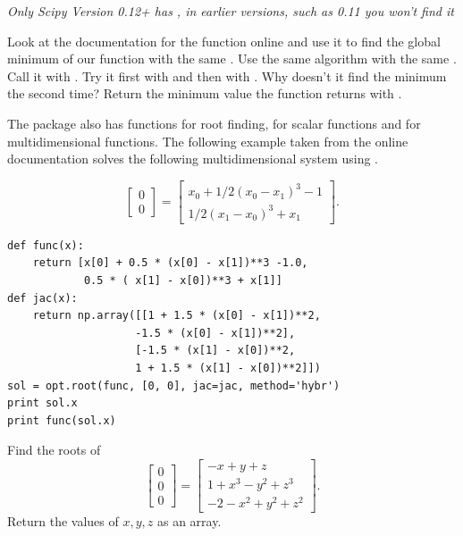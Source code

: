 \emph{Only Scipy Version 0.12+ has , in earlier versions, such as 0.11 you won't find it}
\begin{problem}

Look at the documentation for the  function online and use it to find the global minimum of our function with the same . Use the same  algorithm with the same . Call it with .
Try it first with  and then with . Why doesn't it find the minimum the second time? Return the minimum value the function returns with .

\end{problem}

The  package also has functions for root finding, for scalar functions and for multidimensional functions. The following example taken from the online documentation solves the following multidimensional system using .

\[
\begin{bmatrix}
	0 \\
	0
\end{bmatrix} = \begin{bmatrix}
	x_{0} + 1/2 ( x_{0} - x_{1} )^{3} - 1 \\
	1/2(x_{1}-x_{0})^{3} + x_{1}
\end{bmatrix}.
\]

\begin{lstlisting}
def func(x):
    return [x[0] + 0.5 * (x[0] - x[1])**3 -1.0,
            0.5 * ( x[1] - x[0])**3 + x[1]]
def jac(x):
    return np.array([[1 + 1.5 * (x[0] - x[1])**2,
                    -1.5 * (x[0] - x[1])**2],
                    [-1.5 * (x[1] - x[0])**2,
                    1 + 1.5 * (x[1] - x[0])**2]])
sol = opt.root(func, [0, 0], jac=jac, method='hybr')
print sol.x
print func(sol.x)
\end{lstlisting}

\begin{problem}
Find the roots of
\[
\begin{bmatrix}
	0 \\
	0 \\
	0
\end{bmatrix} = \begin{bmatrix}
	-x+y+z \\
	1+x^3-y^2+z^3\\
	-2-x^2+y^2+z^2
\end{bmatrix}.
\]
Return the values of $x,y,z$ as an array.
\end{problem}



